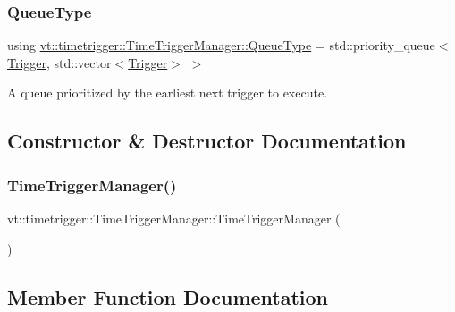 \subsubsection{\texorpdfstring{Queue\+Type}{QueueType}}
{\footnotesize\ttfamily using \hyperlink{structvt_1_1timetrigger_1_1_time_trigger_manager_ad5dc7eeeb4b0d12a5582544d8f0a08c8}{vt\+::timetrigger\+::\+Time\+Trigger\+Manager\+::\+Queue\+Type} =  std\+::priority\+\_\+queue$<$\hyperlink{structvt_1_1timetrigger_1_1_trigger}{Trigger}, std\+::vector$<$\hyperlink{structvt_1_1timetrigger_1_1_trigger}{Trigger}$>$ $>$}



A queue prioritized by the earliest next trigger to execute. 



\subsection{Constructor \& Destructor Documentation}
\mbox{\label{structvt_1_1timetrigger_1_1_time_trigger_manager_a5739a97e0a8c7a19943d030a04e63a35}} 
\subsubsection{\texorpdfstring{Time\+Trigger\+Manager()}{TimeTriggerManager()}}
{\footnotesize\ttfamily vt\+::timetrigger\+::\+Time\+Trigger\+Manager\+::\+Time\+Trigger\+Manager (\begin{DoxyParamCaption}{ }\end{DoxyParamCaption})\hspace{0.3cm}{\ttfamily [default]}}



\subsection{Member Function Documentation}
\mbox{\label{structvt_1_1timetrigger_1_1_time_trigger_manager_a42729a0a83f734dad3ef6d95b5afb3d9}} 
